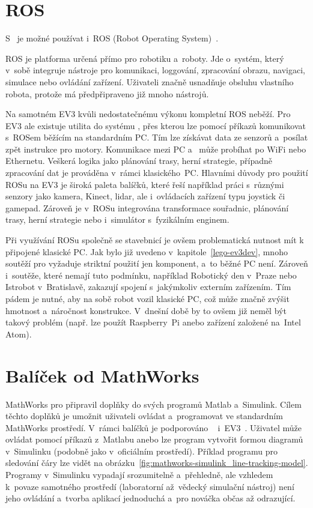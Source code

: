 \section{ROS}

S~\legoEV{} je možné používat i~ROS (Robot Operating System)~\cite{legoProgramingPlatform_ROS}. 

ROS je platforma určená přímo pro robotiku a~roboty. 
Jde o~systém, který v~sobě integruje nástroje pro komunikaci, loggování, zpracování obrazu, navigaci, simulace nebo ovládání zařízení. 
Uživateli značně usnadňuje obsluhu vlastního robota, protože má předpřipraveno již mnoho nástrojů.

Na samotném EV3 kvůli nedostatečnému výkonu   kompletní ROS neběží.
Pro EV3 ale existuje utilita do systému \evThreeDev{}, přes kterou lze pomocí příkazů komunikovat s~ROSem běžícím na standardním PC. 
Tím lze získávat data ze senzorů a~posílat zpět instrukce pro motory. 
Komunikace mezi PC a~ může probíhat po WiFi nebo Ethernetu.
Veškerá logika jako plánování trasy, herní strategie, případně zpracování dat je prováděna v~rámci klasického~PC.
Hlavními důvody pro použití ROSu na EV3 je široká paleta balíčků, které řeší například práci s~různými senzory jako kamera, Kinect, lidar, ale i~ovládacích zařízení typu joystick či gamepad. 
Zároveň je v~ROSu integrována transformace souřadnic, plánování trasy, herní strategie nebo i~simulátor s~fyzikálním enginem.


Při využívání ROSu společně se stavebnicí \lego{} je ovšem problematická nutnost mít k~ připojené klasické PC. 
Jak bylo již uvedeno v~kapitole~\ref{lego-ev3dev}, mnoho soutěží pro \legoM{} vyžaduje striktní použití jen \lego{} komponent, a~to běžné PC není. 
Zároveň i~soutěže, které nemají tuto podmínku, například Robotický den v~Praze nebo Istrobot v~Bratislavě, zakazují spojení s~jakýmkoliv externím zařízením.
Tím pádem je nutné, aby na sobě \lego{} robot vozil klasické PC, což může značně zvýšit hmotnost a~náročnost konstrukce. 
V~dnešní době by to ovšem již neměl být takový problém (např. lze použít Raspberry~Pi anebo zařízení založené na~Intel Atom).

\section{Balíček od MathWorks}
\label{lego-alternative-soft_mathworks}

MathWorks pro \legoM{} připravil doplňky do svých programů Matlab a~Simulink. 
Cílem těchto doplňků je umožnit uživateli ovládat a~programovat \legoM{} ve standardním MathWorks prostředí. 
V~rámci balíčků je podporováno \legoNXT~\cite{legoProgramingPlatform_MathWork-NXT} i~EV3~\cite{legoProgramingPlatform_MathWork-EV3}.
Uživatel může ovládat \brick{} pomocí příkazů z~Matlabu anebo lze program vytvořit formou diagramů v~Simulinku (podobně jako v~oficiálním \lego{} prostředí). 
Příklad programu pro sledování čáry lze vidět na obrázku~\ref{fig:mathworks-simulink_line-tracking-model}.
Programy v~Simulinku vypadají srozumitelně a~přehledně, ale vzhledem k~povaze samotného prostředí (laboratorní až~vědecký simulační nástroj) není jeho ovládání a~tvorba aplikací jednoduchá a~pro nováčka občas až odrazující. 

